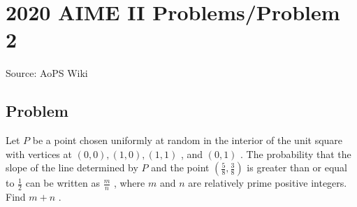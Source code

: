 \documentclass[12pt]{article}
\begin{document}
\section*{{2020 AIME II Problems/Problem 2}}
Source: AoPS Wiki

\subsection*{Problem}
Let $P$ be a point chosen uniformly at random in the interior of the unit square with vertices at $(0,0), (1,0), (1,1)$ , and $(0,1)$ . The probability that the slope of the line determined by $P$ and the point $\left(\frac58, \frac38 \right)$ is greater than or equal to $\frac12$ can be written as $\frac{m}{n}$ , where $m$ and $n$ are relatively prime positive integers. Find $m+n$ .
\end{document}
